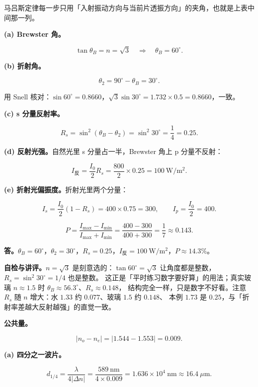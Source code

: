 \documentclass[11pt]{ctexart}
\begin{document}
马吕斯定律每一步只用「入射振动方向与当前片透振方向」的夹角，也就是上表中间那一列。


\textbf{(a) Brewster 角。}

\[
\tan\theta_B=n=\sqrt3
\quad\Longrightarrow\quad
\theta_B=60^\circ .
\]

\textbf{(b) 折射角。}

\[
\theta_2=90^\circ-\theta_B=30^\circ .
\]

用 Snell 核对：$\sin60^\circ=0.8660$，$\sqrt3\sin30^\circ=1.732\times0.5=0.8660$，一致。

\textbf{(c) s 分量反射率。}

\[
R_s=\sin^2(\theta_B-\theta_2)=\sin^2 30^\circ=\frac14=0.25 .
\]

\textbf{(d) 反射光强。}自然光里 s 分量占一半，Brewster 角上 p 分量不反射：

\[
I_{\text{反}}=\frac{I_0}{2}R_s=\frac{800}{2}\times0.25=100\ \mathrm{W/m^2}.
\]

\textbf{(e) 折射光偏振度。}折射光里两个分量：

\[
I_s=\frac{I_0}{2}(1-R_s)=400\times0.75=300,\qquad
I_p=\frac{I_0}{2}=400 .
\]

\[
P=\frac{I_{\max}-I_{\min}}{I_{\max}+I_{\min}}
=\frac{400-300}{400+300}=\frac17\approx0.143 .
\]

\textbf{答。}$\theta_B=60^\circ$，$\theta_2=30^\circ$，$R_s=0.25$，$I_{\text{反}}=100\ \mathrm{W/m^2}$，$P\approx14.3\%$。

\textbf{自检与讲评。}$n=\sqrt3$ 是刻意选的：$\tan60^\circ=\sqrt3$ 让角度都是整数，$R_s=\sin^2 30^\circ=1/4$ 也是整数。
这正是「平时练习数字要好算」的用法；真实玻璃 $n\approx1.5$ 时 $\theta_B\approx56.3^\circ$、$R_s\approx0.148$，
结构完全一样，只是数字不好看。注意 $R_s$ 随 $n$ 增大：水 $1.33$ 约 $0.077$、玻璃 $1.5$ 约 $0.148$、
本例 $1.73$ 是 $0.25$，与「折射率差越大反射越强」的直觉一致。


\textbf{公共量。}

\[
|n_o-n_e|=|1.544-1.553|=0.009 .
\]

\textbf{(a) 四分之一波片。}

\[
d_{1/4}=\frac{\lambda}{4|\Delta n|}
=\frac{589\ \mathrm{nm}}{4\times0.009}
=1.636\times10^{4}\ \mathrm{nm}
\approx16.4\ \mu\mathrm{m}.
\]
\end{document}
